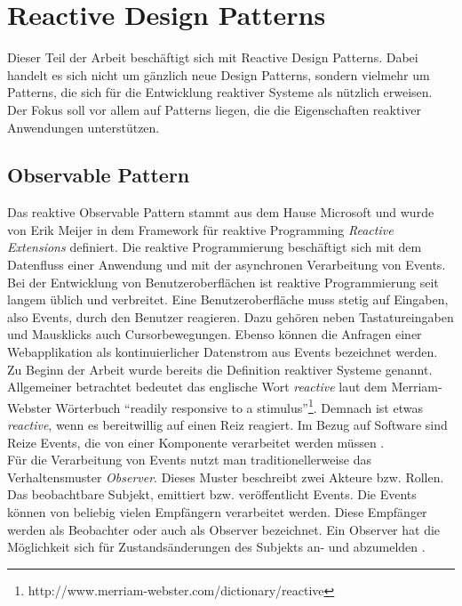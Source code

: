 \section{Reactive Design Patterns}

Dieser Teil der Arbeit beschäftigt sich mit Reactive Design Patterns. Dabei handelt es sich nicht um gänzlich neue Design Patterns, sondern vielmehr um Patterns, die sich für die Entwicklung reaktiver Systeme als nützlich erweisen. Der Fokus soll vor allem auf Patterns liegen, die die Eigenschaften reaktiver Anwendungen unterstützen.

\subsection{Observable Pattern}
Das reaktive Observable Pattern stammt aus dem Hause Microsoft und wurde von Erik Meijer in dem Framework für reaktive Programming \textit{Reactive Extensions} definiert. Die reaktive Programmierung beschäftigt sich mit dem Datenfluss einer Anwendung und mit der asynchronen Verarbeitung von Events. Bei der Entwicklung von Benutzeroberflächen ist reaktive Programmierung seit langem üblich und verbreitet. Eine Benutzeroberfläche muss stetig auf Eingaben, also Events, durch den Benutzer reagieren. Dazu gehören neben Tastatureingaben und Mausklicks auch Cursorbewegungen. Ebenso können die Anfragen einer Webapplikation als kontinuierlicher Datenstrom aus Events bezeichnet werden.\\
Zu Beginn der Arbeit wurde bereits die Definition reaktiver Systeme genannt. Allgemeiner betrachtet bedeutet das englische Wort \textit{reactive} laut dem Merriam-Webster Wörterbuch \enquote{readily responsive to a stimulus}\footnote{http://www.merriam-webster.com/dictionary/reactive}. Demnach ist etwas \textit{reactive}, wenn es bereitwillig auf einen Reiz reagiert. Im Bezug auf Software sind Reize Events, die von einer Komponente verarbeitet werden müssen \cite{rappl_introduction_2016} \cite[S.~4]{carkci_dataflow_2014} \cite[S.~5]{blackheath_functional_2015}.\\
Für die Verarbeitung von Events nutzt man traditionellerweise das Verhaltensmuster \textit{Observer}. Dieses Muster beschreibt zwei Akteure bzw. Rollen. Das beobachtbare Subjekt, emittiert bzw. veröffentlicht Events. Die Events können von beliebig vielen Empfängern verarbeitet werden. Diese Empfänger werden als Beobachter oder auch als Observer bezeichnet. Ein Observer hat die Möglichkeit sich für Zustandsänderungen des Subjekts an- und abzumelden \cite[S.~293]{gamma_design_1995}.\\
